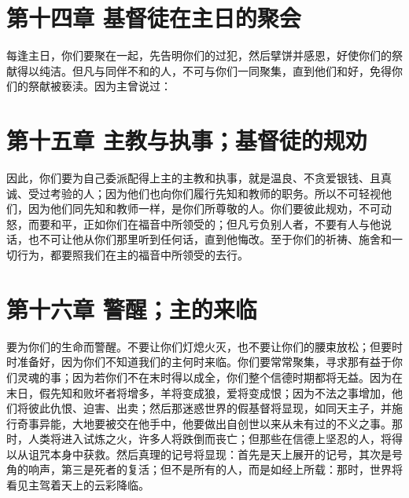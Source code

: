 
\section{第十四章 基督徒在主日的聚会}

每逢主日，你们要聚在一起，先告明你们的过犯，然后擘饼并感恩，好使你们的祭献得以纯洁。但凡与同伴不和的人，不可与你们一同聚集，直到他们和好，免得你们的祭献被亵渎。因为主曾说过：\par


\section{第十五章 主教与执事；基督徒的规劝}

因此，你们要为自己委派配得上主的主教和执事，就是温良、不贪爱银钱、且真诚、受过考验的人；因为他们也向你们履行先知和教师的职务。所以不可轻视他们，因为他们同先知和教师一样，是你们所尊敬的人。你们要彼此规劝，不可动怒，而要和平，正如你们在福音中所领受的；但凡亏负别人者，不要有人与他说话，也不可让他从你们那里听到任何话，直到他悔改。至于你们的祈祷、施舍和一切行为，都要照我们在主的福音中所领受的去行。\par


\section{第十六章 警醒；主的来临}

要为你们的生命而警醒。不要让你们灯熄火灭，也不要让你们的腰束放松；但要时时准备好，因为你们不知道我们的主何时来临。你们要常常聚集，寻求那有益于你们灵魂的事；因为若你们不在末时得以成全，你们整个信德时期都将无益。因为在末日，假先知和败坏者将增多，羊将变成狼，爱将变成恨；因为不法之事增加，他们将彼此仇恨、迫害、出卖；然后那迷惑世界的假基督将显现，如同天主子，并施行奇事异能，大地要被交在他手中，他要做出自创世以来从未有过的不义之事。那时，人类将进入试炼之火，许多人将跌倒而丧亡；但那些在信德上坚忍的人，将得以从诅咒本身中获救。然后真理的记号将显现：首先是天上展开的记号，其次是号角的响声，第三是死者的复活；但不是所有的人，而是如经上所载：那时，世界将看见主驾着天上的云彩降临。\par

